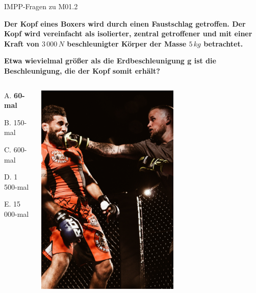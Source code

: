 \documentclass{beamer}
\begin{document}
\begin{frame}{IMPP-Fragen zu M01.2}
    
    \textbf{Der Kopf eines Boxers wird durch einen Faustschlag getroffen. Der Kopf wird vereinfacht als isolierter, zentral getroffener und mit einer Kraft von \(3\,000\,N\) beschleunigter Körper der Masse \(5\,kg\) betrachtet.}
    
\textbf{    Etwa wievielmal größer als die Erdbeschleunigung g ist die Beschleunigung, die der Kopf somit erhält?    } \\[0.2cm]
    
    

\begin{columns}[c]
\begin{column}{5cm}

    \begin{description}
    \item{A.} \textbf{\textcolor{theme}{60-mal} }
    \item{B.} 150-mal
    \item{C.} 600-mal
    \item{D.} 1\,500-mal
    \item{E.} 15\,000-mal
    \end{description}
    
    
    

    
    \end{column}

    \begin{column}{5cm}

\begin{center}
    \includegraphics[width=0.6\textwidth]{boxer.jpg}
\end{center}
    
    \end{column}

    
    \end{columns}
    
\end{frame}
\end{document}
